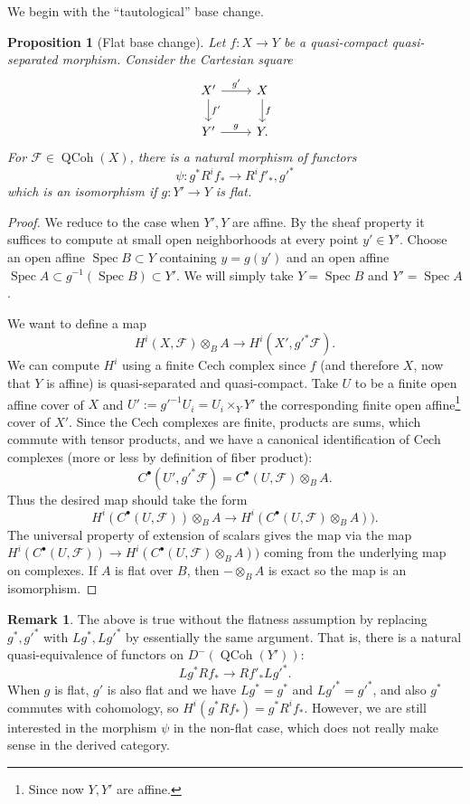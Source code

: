 \documentclass[10pt]{article}
\newtheorem{prop}[thm]{Proposition}
\theoremstyle{definition}
\newtheorem{rmk}[thm]{Remark}
\DeclareMathOperator{\Spec}{Spec}
\DeclareMathOperator{\QCoh}{QCoh}
\begin{document}
We begin with the ``tautological'' base change.
\begin{prop}[Flat base change]
Let $f: X \rightarrow Y$ be a quasi-compact quasi-separated morphism.  Consider the Cartesian square
$$\begin{tikzcd}
X' \arrow[r, "g'"] \arrow[d, "f'"] & X \arrow[d, "f"] \\
Y' \arrow[r, "g"] & Y.
\end{tikzcd}$$
For $\mathcal{F} \in \QCoh(X)$, there is a natural morphism of functors 
$$\psi: g^* R^i f_* \rightarrow R^if'_*, g'^*$$
which is an isomorphism if  $g: Y' \rightarrow Y$ is flat.
\end{prop}
\begin{proof}
We reduce to the case when $Y', Y$ are affine.  By the sheaf property it suffices to compute at small open neighborhoods at every point $y' \in Y'$.  Choose an open affine $\Spec B \subset Y$ containing $y = g(y')$ and an open affine $\Spec A \subset g^{-1}(\Spec B)  \subset Y'$.  We will simply take $Y = \Spec B$ and $Y' = \Spec A$.


We want to define a map
$$H^i(X, \mathcal{F}) \otimes_B A \rightarrow H^i(X', g'^* \mathcal{F}).$$
We can compute $H^i$ using a finite Cech complex since $f$ (and therefore $X$, now that $Y$ is affine) is quasi-separated and quasi-compact.  Take $U$ to be a finite open affine cover of $X$ and $U' := g'^{-1}U_i = U_i \times_Y Y'$ the corresponding finite open affine\footnote{Since now $Y, Y'$ are affine.} cover of $X'$.  Since the Cech complexes are finite, products are sums, which commute with tensor products, and we have a canonical identification of Cech complexes (more or less by definition of fiber product):
$$C^\bullet(U',g'^* \mathcal{F}) =  C^\bullet(U, \mathcal{F}) \otimes_B A.$$
Thus the desired map should take the form
$$H^i(C^\bullet(U, \mathcal{F})) \otimes_B A \rightarrow H^i(C^\bullet(U, \mathcal{F}) \otimes_B A)).$$
The universal property of extension of scalars gives the map via the map $H^i(C^\bullet(U, \mathcal{F})) \rightarrow H^i(C^\bullet(U, \mathcal{F}) \otimes_B A))$ coming from the underlying map on complexes.  If $A$ is flat over $B$, then $- \otimes_B A$ is exact so the map is an isomorphism.
\end{proof}

\begin{rmk}
The above is true without the flatness assumption by replacing $g^*, g'^*$ with $Lg^*, Lg'^*$ by essentially the same argument.  That is, there is a natural quasi-equivalence of functors on $D^-(\QCoh(Y'))$:
$$Lg^* Rf_* \rightarrow Rf'_* Lg'^*.$$
When $g$ is flat, $g'$ is also flat and we have $Lg^* = g^*$ and $Lg'^* = g'^*$, and also $g^*$ commutes with cohomology, so $H^i(g^* Rf_*) = g^* R^i f_*$.  However, we are still interested in the morphism $\psi$ in the non-flat case, which does not really make sense in the derived category.
\end{rmk}
\end{document}
